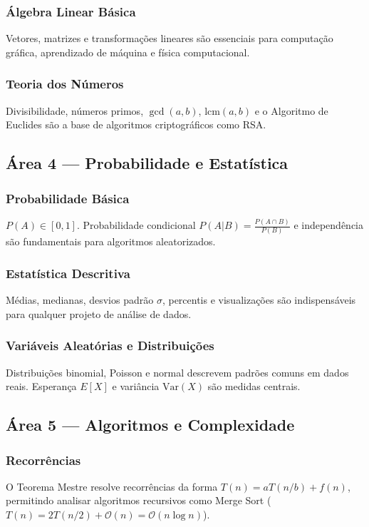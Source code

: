 \subsubsection*{Álgebra Linear Básica}
Vetores, matrizes e transformações lineares são essenciais para computação gráfica,
aprendizado de máquina e física computacional.

\subsubsection*{Teoria dos Números}
Divisibilidade, números primos, $\gcd(a,b)$, $\text{lcm}(a,b)$ e o Algoritmo de Euclides
são a base de algoritmos criptográficos como RSA.

\subsection*{Área 4 --- Probabilidade e Estatística}

\subsubsection*{Probabilidade Básica}
$P(A) \in [0,1]$. Probabilidade condicional $P(A|B) = \frac{P(A \cap B)}{P(B)}$ e
independência são fundamentais para algoritmos aleatorizados.

\subsubsection*{Estatística Descritiva}
Médias, medianas, desvios padrão $\sigma$, percentis e visualizações são indispensáveis
para qualquer projeto de análise de dados.

\subsubsection*{Variáveis Aleatórias e Distribuições}
Distribuições binomial, Poisson e normal descrevem padrões comuns em dados reais. Esperança
$E[X]$ e variância $\text{Var}(X)$ são medidas centrais.

\subsection*{Área 5 --- Algoritmos e Complexidade}

\subsubsection*{Recorrências}
O Teorema Mestre resolve recorrências da forma $T(n) = aT(n/b) + f(n)$, permitindo analisar
algoritmos recursivos como Merge Sort
($T(n) = 2T(n/2) + \mathcal{O}(n) = \mathcal{O}(n \log n)$).

